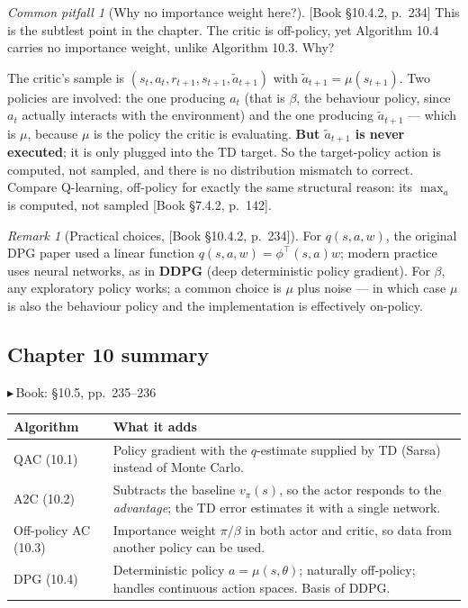 \documentclass[11pt, letterpaper]{article}
\theoremstyle{runin}
\theoremstyle{runinplain}
\theoremstyle{remark}
\newtheorem*{remark}{Remark}
\newtheorem*{warning}{Common pitfall}
\newcommand{\bk}[1]{{\color{bookblue}\small$\blacktriangleright$\,\textsf{Book: #1}}}
\newcommand{\bkin}[1]{{\color{bookblue}\small[\textsf{Book #1}]}}
\begin{document}
\begin{warning}[Why no importance weight here?]
\bkin{\S10.4.2, p.~234} This is the subtlest point in the chapter. The critic is
off-policy, yet Algorithm 10.4 carries no importance weight, unlike Algorithm 10.3.
Why?

The critic's sample is $(s_t,a_t,r_{t+1},s_{t+1},\tilde a_{t+1})$ with
$\tilde a_{t+1}=\mu(s_{t+1})$. Two policies are involved: the one producing $a_t$
(that is $\beta$, the behaviour policy, since $a_t$ actually interacts with the
environment) and the one producing $\tilde a_{t+1}$ --- which is $\mu$, because $\mu$
is the policy the critic is evaluating. \textbf{But $\tilde a_{t+1}$ is never
executed}; it is only plugged into the TD target. So the target-policy action is
computed, not sampled, and there is no distribution mismatch to correct. Compare
Q-learning, off-policy for exactly the same structural reason: its $\max_a$ is
computed, not sampled \bkin{\S7.4.2, p.~142}.
\end{warning}

\begin{remark}[Practical choices, \bkin{\S10.4.2, p.~234}]
For $q(s,a,w)$, the original DPG paper used a linear function
$q(s,a,w)=\phi^{\!\top}(s,a)w$; modern practice uses neural networks, as in
\textbf{DDPG} (deep deterministic policy gradient). For $\beta$, any exploratory
policy works; a common choice is $\mu$ plus noise --- in which case $\mu$ is also the
behaviour policy and the implementation is effectively on-policy.
\end{remark}

\subsection{Chapter 10 summary}

\bk{\S10.5, pp.~235--236}

\begin{center}
\small
\begin{tabular}{@{}lp{}@{}}
\toprule
Algorithm & What it adds \\
\midrule
QAC (10.1) & Policy gradient with the $q$-estimate supplied by TD (Sarsa) instead of Monte Carlo. \\
A2C (10.2) & Subtracts the baseline $v_\pi(s)$, so the actor responds to the \emph{advantage}; the TD error estimates it with a single network. \\
Off-policy AC (10.3) & Importance weight $\pi/\beta$ in both actor and critic, so data from another policy can be used. \\
DPG (10.4) & Deterministic policy $a=\mu(s,\theta)$; naturally off-policy; handles continuous action spaces. Basis of DDPG. \\
\bottomrule
\end{tabular}
\end{center}
\end{document}
